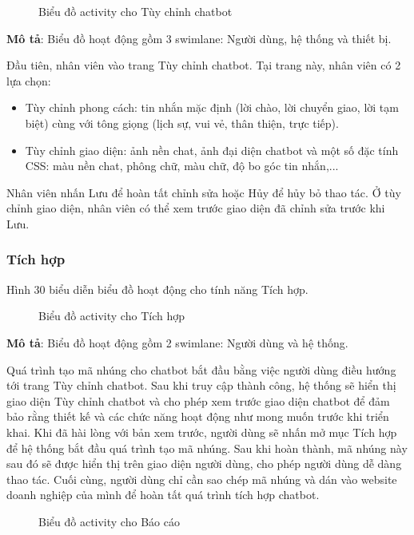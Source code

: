 \begin{figure}[H]
    \centering
     
    \vspace{0.5cm}
    \caption{Biểu đồ activity cho Tùy chỉnh chatbot}
    \label{fig:enter-label}
\end{figure}

\textbf{Mô tả}: Biểu đồ hoạt động gồm 3 swimlane: Người dùng, hệ thống và thiết bị.

Đầu tiên, nhân viên vào trang Tùy chỉnh chatbot. Tại trang này, nhân viên có 2 lựa chọn:
\begin{itemize}
	\item Tùy chỉnh phong cách: tin nhắn mặc định (lời chào, lời chuyển giao, lời tạm biệt) cùng với tông giọng (lịch sự, vui vẻ, thân thiện, trực tiếp).
	\item Tùy chỉnh giao diện: ảnh nền chat, ảnh đại diện chatbot và một số đặc tính CSS: màu nền chat, phông chữ, màu chữ, độ bo góc tin nhắn,...
\end{itemize} 

Nhân viên nhấn Lưu để hoàn tất chỉnh sửa hoặc Hủy để hủy bỏ thao tác. Ở tùy chỉnh giao diện, nhân viên có thể xem trước giao diện đã chỉnh sửa trước khi Lưu.


\subsubsection{Tích hợp}
Hình 30 biểu diễn biểu đồ hoạt động cho tính năng Tích hợp.

\begin{figure}[H]
    \centering
     
    \vspace{0.5cm}
    \caption{Biểu đồ activity cho Tích hợp}
    \label{fig:enter-label}
\end{figure}

\textbf{Mô tả}: Biểu đồ hoạt động gồm 2 swimlane: Người dùng và hệ thống.

\par Quá trình tạo mã nhúng cho chatbot bắt đầu bằng việc người dùng điều hướng tới trang Tùy chỉnh chatbot. Sau khi truy cập thành công, hệ thống sẽ hiển thị giao diện Tùy chỉnh chatbot và cho phép xem trước giao diện chatbot để đảm bảo rằng thiết kế và các chức năng hoạt động như mong muốn trước khi triển khai. Khi đã hài lòng với bản xem trước, người dùng sẽ nhấn mở mục Tích hợp để hệ thống bắt đầu quá trình tạo mã nhúng. Sau khi hoàn thành, mã nhúng này sau đó sẽ được hiển thị trên giao diện người dùng, cho phép người dùng dễ dàng thao tác. Cuối cùng, người dùng chỉ cần sao chép mã nhúng và dán vào website doanh nghiệp của mình để hoàn tất quá trình tích hợp chatbot.
\begin{figure}[H]
    \centering
     
    \vspace{0.5cm}
    \caption{Biểu đồ activity cho Báo cáo}
    \label{fig:enter-label}
\end{figure}

